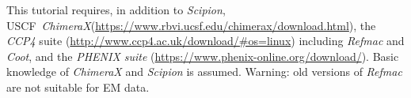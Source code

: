\documentclass[12pt]{article} %
\def\ccp4{\textit{CCP4}\xspace}
\def\chimera{\textit{ChimeraX}\xspace}
\def\coot{\textit{Coot}\xspace}
\def\refmac{\textit{Refmac}\xspace}
\def\scipion{\textit{Scipion}\xspace}
\begin{document}
This tutorial requires, in addition to \scipion, USCF~\chimera (\url{https://www.rbvi.ucsf.edu/chimerax/download.html}), the \ccp4 suite (\url{http://www.ccp4.ac.uk/download/#os=linux}) including \refmac and \coot, and the \textit{PHENIX suite} (\url{https://www.phenix-online.org/download/}). Basic knowledge of \chimera and \scipion is assumed. Warning: old versions of \refmac are not suitable for EM data.

\newpage



\tableofcontents %

\newpage %




















\end{document}
